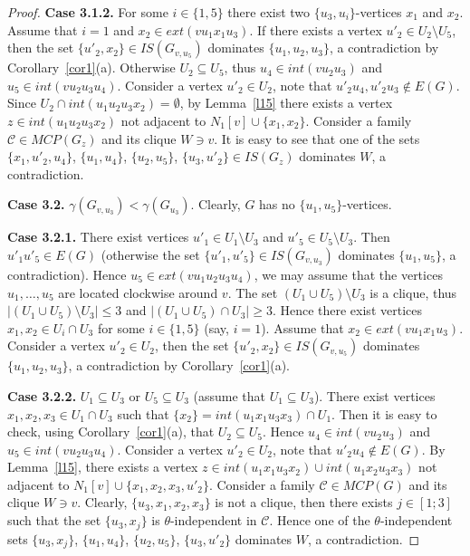 \documentclass[12pt]{article}
\begin{document}
\begin{proof}
\textbf{Case 3.1.2.} For some $i \in \{1,5\}$ there exist two $\{u_3,u_i\}$-vertices $x_1$ and $x_2$. Assume that $i = 1$ and $x_2 \in ext(vu_1x_1u_3)$. If there exists a vertex $u'_2 \in U_2 \setminus U_5$, then the set $\{u'_2,x_2\} \in IS(G_{v,u_5})$ dominates $\{u_1,u_2,u_3\}$, a contradiction by Corollary~\ref{cor1}(a). Otherwise $U_2 \subseteq U_5$, thus $u_4 \in int(vu_2u_3)$ and $u_5 \in int(vu_2u_3u_4)$. Consider a vertex $u'_2 \in U_2$, note that $u'_2u_4, u'_2u_3 \notin E(G)$. Since $U_2 \cap int(u_1u_2u_3x_2) = \emptyset$, by Lemma~\ref{l15} there exists a vertex $z \in int(u_1u_2u_3x_2)$ not adjacent to $N_1[v] \cup \{x_1,x_2\}$. Consider a family $\mathcal{C} \in MCP(G_z)$ and its clique $W \ni v$. It is easy to see that one of the sets $\{x_1,u'_2,u_4\}$, $\{u_1,u_4\}$, $\{u_2,u_5\}$, $\{u_3,u'_2\} \in IS(G_z)$ dominates $W$, a contradiction. 

\textbf{Case 3.2.} $\gamma(G_{v,u_3}) < \gamma(G_{u_3})$. Clearly, $G$ has no $\{u_1,u_5\}$-vertices.

\textbf{Case 3.2.1.} There exist vertices $u'_1 \in U_1 \setminus U_3$ and $u'_5 \in U_5 \setminus U_3$. Then $u'_1u'_5 \in E(G)$ (otherwise the set $\{u'_1,u'_5\} \in IS(G_{v,u_3})$ dominates $\{u_1,u_5\}$, a contradiction). Hence $u_5 \in ext(vu_1u_2u_3u_4)$, we may assume that the vertices $u_1,\ldots,u_5$ are located clockwise around $v$. The set $(U_1 \cup U_5) \setminus U_3$ is a clique, thus $|(U_1 \cup U_5) \setminus U_3| \leq 3$ and $|(U_1 \cup U_5) \cap U_3| \geq 3$. Hence there exist vertices $x_1,x_2 \in U_i \cap U_3$ for some $i \in \{1,5\}$ (say, $i = 1$). Assume that $x_2 \in ext(vu_1x_1u_3)$. Consider a vertex $u'_2 \in U_2$, then the set $\{u'_2,x_2\} \in IS(G_{v,u_5})$ dominates $\{u_1,u_2,u_3\}$, a contradiction by Corollary~\ref{cor1}(a).

\textbf{Case 3.2.2.} $U_1 \subseteq U_3$ or $U_5 \subseteq U_3$ (assume that $U_1 \subseteq U_3$). There exist vertices $x_1,x_2,x_3 \in U_1 \cap U_3$ such that $\{x_2\} = int(u_1x_1u_3x_3) \cap U_1$. Then it is easy to check, using Corollary~\ref{cor1}(a), that $U_2 \subseteq U_5$. Hence $u_4 \in int(vu_2u_3)$ and $u_5 \in int(vu_2u_3u_4)$. Consider a vertex $u'_2 \in U_2$, note that $u'_2u_4 \notin E(G)$. By Lemma~\ref{l15}, there exists a vertex $z \in int(u_1x_1u_3x_2) \cup int(u_1x_2u_3x_3)$ not adjacent to $N_1[v] \cup \{x_1,x_2,x_3,u'_2\}$. Consider a family $\mathcal{C} \in MCP(G)$ and its clique $W \ni v$. Clearly, $\{u_3,x_1,x_2,x_3\}$ is not a clique, then there exists $j \in [1;3]$ such that the set $\{u_3,x_j\}$ is $\theta$-independent in $\mathcal{C}$. Hence one of the $\theta$-independent sets $\{u_3,x_j\}$, $\{u_1,u_4\}$, $\{u_2,u_5\}$, $\{u_3,u'_2\}$ dominates $W$, a contradiction.
\end{proof}
\end{document}
